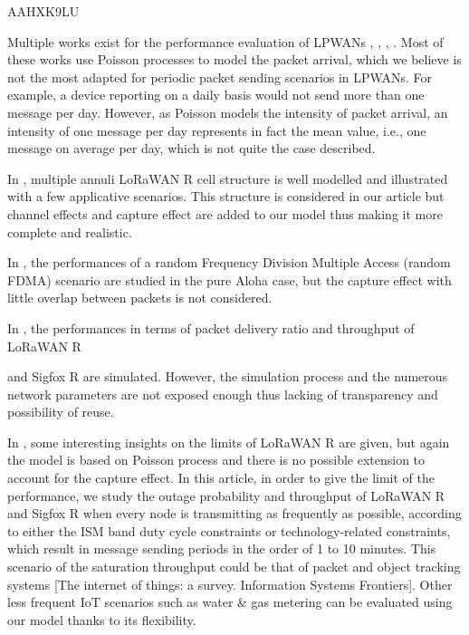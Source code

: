 \cite{li_2d_2016} AAHXK9LU

Multiple works exist for the performance evaluation of LPWANs \cite{mikhaylov_analysis_2016},
	\cite{goursaud_random_2016},
	\cite{adelantado_understanding_2017},
	\cite{reynders_range_2016}.
Most of these works use Poisson processes to model the packet arrival,
	which we believe is not the most adapted for periodic packet sending scenarios in LPWANs.
For example,
	a device reporting on a daily basis would not send more than one message per day.
However,
	as Poisson models the intensity of packet arrival,
	an intensity of one message per day represents in fact the mean value,
	i.e.,
	one message on average per day,
	which is not quite the case described.

In \cite{mikhaylov_analysis_2016},
	multiple annuli LoRaWAN R cell structure is well modelled and illustrated with a few applicative scenarios.
This structure is considered in our article but channel effects and capture effect are added to our model thus making it more complete and realistic.

In \cite{goursaud_random_2016},
	the performances of a random Frequency Division Multiple Access (random FDMA) scenario are studied in the pure Aloha case,
	but the capture effect with little overlap between packets is not considered.

In \cite{reynders_range_2016},
	the performances in terms of packet delivery ratio and throughput of LoRaWAN R

and Sigfox R are simulated.
However,
	the simulation process and the numerous network parameters are not exposed enough thus lacking of transparency and possibility of reuse.

In \cite{adelantado_understanding_2017},
	some interesting insights on the limits of LoRaWAN R are given,
	but again the model is based on Poisson process and there is no possible extension to account for the capture effect.
In this article,
	in order to give the limit of the performance,
	we study the outage probability and throughput of LoRaWAN R and Sigfox R when every node is transmitting as frequently as possible,
	according to either the ISM band duty cycle constraints or technology-related constraints,
	which result in message sending periods in the order of 1 to 10 minutes.
This scenario of the saturation throughput could be that of packet and object tracking systems [The internet of things:
	a survey.
Information Systems Frontiers].
Other less frequent IoT scenarios such as water \& gas metering can be evaluated using our model thanks to its flexibility.

